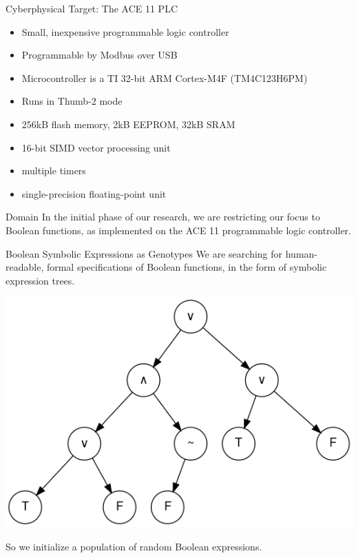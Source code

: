 \documentclass[presentation]{beamer}
\begin{document}
\begin{frame}[label={sec:orge85f061}]{Cyberphysical Target: The ACE 11 PLC}
\begin{itemize}
\item Small, inexpensive programmable logic controller
\item Programmable by Modbus over USB
\item Microcontroller is a TI 32-bit ARM Cortex-M4F (TM4C123H6PM)
\item Runs in Thumb-2 mode
\item 256kB flash memory, 2kB EEPROM, 32kB SRAM
\item 16-bit SIMD vector processing unit
\item multiple timers
\item single-precision floating-point unit
\end{itemize}
\end{frame}

\begin{frame}[label={sec:org0d0b141}]{Domain}
In the initial phase of our research, we are restricting our focus to \alert{Boolean functions}, as implemented on the ACE 11 programmable logic controller.
\end{frame}

\begin{frame}[label={sec:orge05b1e6}]{Boolean Symbolic Expressions as Genotypes}
We are searching for human-readable, formal specifications of Boolean functions, in the form of symbolic expression trees.

\begin{center}
\includegraphics[width=.9\linewidth]{./img/boolean_sexp.png}
\end{center}

So we initialize a population of random Boolean expressions.
\end{frame}
\end{document}

